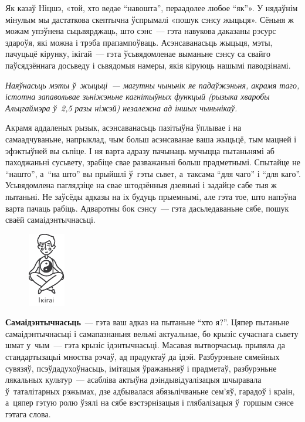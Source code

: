 Як казаў Ніцшэ, «той, хто ведае ``навошта'', пераадолее любое ``як''». У нядаўнім мінулым мы дастаткова скептычна ўспрымалі «пошук сэнсу жыцьця». Сёньня ж можам упэўнена сьцьвярджаць, што сэнс~--- гэта навукова даказаны рэсурс здароўя, які можна і трэба прапампоўваць. Асэнсаванасьць жыцьця, мэты, пачуцьцё кірунку, ікігай~--- гэта ўсьвядомленае выманьне сэнсу са свайго паўсядзённага досьведу і сьвядомыя намеры, якія кіруюць нашымі паводзінамі.

\emph{Наяўнасьць мэты ў~жыцьці~--- магутны чыньнік яе падаўжэньня, акрамя таго, істотна запавольвае зьніжэньне кагнітыўных функцый (рызыка хваробы Альцгаймэра ў~2,5 разы ніжэй) незалежна ад іншых чыньнікаў.}

Акрамя аддаленых рызык, асэнсаванасьць пазітыўна ўплывае і на самаадчуваньне, напрыклад, чым больш асэнсаванае ваша жыцьцё, тым мацней і эфэктыўней вы сьпіце. І ня варта адразу пачынаць мучыцца пытаньнямі аб паходжаньні сусьвету, зрабіце свае разважаньні больш прадметнымі. Спытайце не ``нашто'', а~``на што'' вы прыйшлі ў~гэты сьвет, а~таксама ``для чаго'' і ``для каго''. Усьвядомлена паглядзіце на свае штодзённыя дзеяньні і задайце сабе тыя ж пытаньні. Не заўсёды адказы на іх будуць прыемнымі, але гэта тое, што напэўна варта пачаць рабіць. Адваротны бок сэнсу~--- гэта дасьледаваньне сябе, пошук сваёй самаідэнтычнасьці.

\begin{figure}[htb!]
  \centering
  \includegraphics[scale=1.5]{willpower/ch9/11.pdf}
\end{figure}

\textbf{Самаідэнтычнасьць}~--- гэта ваш адказ на пытаньне ``хто я?''. Цяпер пытаньне самаідэнтычнасьці і самапазнаньня вельмі актуальнае, бо крызіс сучаснага сьвету шмат у~чым~--- гэта крызіс ідэнтычнасьці. Масавая вытворчасьць прывяла да стандартызацыі мноства рэчаў, ад прадуктаў да ідэй. Разбурэньне сямейных сувязяў, псэўдадухоўнасьць, імітацыя ўражаньняў і прадметаў, разбурэньне лякальных культур~--- асабліва актыўна дэіндывідуалізацыя шчыравала ў~таталітарных рэжымах, дзе адбывалася абязьлічваньне сем'яў, гарадоў і краін, а~цяпер гэтую ролю ўзялі на сябе вэстэрнізацыя і глябалізацыя ў~горшым сэнсе гэтага слова.

